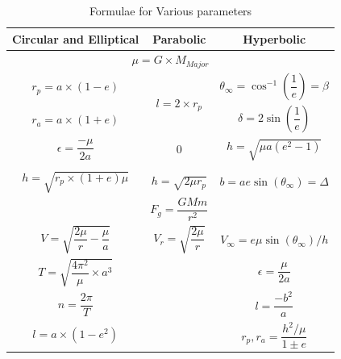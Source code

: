 \begin{table}[H]
\centering
\begin{tabular}{ccc}
\multicolumn{1}{c|}{\textbf{Circular and Elliptical}}           & \multicolumn{1}{c|}{\textbf{Parabolic}}               & \textbf{Hyperbolic}                             \\ \hline
\multicolumn{3}{c}{$\mu=G\times M_{Major}$}                                                                                                                               \\ 
\multicolumn{1}{c|}{$r_p=a\times (1-e)$}                        & \multicolumn{1}{c|}{\multirow{2}{*}{$l=2\times r_p$}} & $\theta_\infty = \cos^{-1}(\dfrac{1}{e})=\beta$ \\
\multicolumn{1}{c|}{$r_a=a\times (1+e)$}                        & \multicolumn{1}{c|}{}                                 & $\delta = 2\sin(\dfrac{1}{e})$                  \\
\multicolumn{1}{c|}{$\epsilon = \dfrac{-\mu}{2a}$}              & \multicolumn{1}{c|}{$0$}                              & $h=\sqrt{\mu a(e^2-1)}$                         \\
\multicolumn{1}{l|}{}                                           & \multicolumn{1}{l|}{}                                 & \multicolumn{1}{l}{}                            \\
\multicolumn{1}{c|}{$h=\sqrt{r_p\times(1+e)\mu}$}               & \multicolumn{1}{c|}{$h=\sqrt{2\mu r_p}$}              & $b=ae\sin(\theta_\infty)=\Delta$                \\
\multicolumn{1}{l}{}                                            & \multirow{2}{*}{$F_g=\dfrac{GMm}{r^2}$}               & \multicolumn{1}{l}{}                            \\
                                                                &                                                       &                                                 \\
\multicolumn{1}{c|}{$V= \sqrt{\dfrac{2\mu}{r}-\dfrac{\mu}{a}}$} & \multicolumn{1}{c|}{$V_r=\sqrt{\dfrac{2\mu}{r}}$}     & $V_\infty=e\mu\sin(\theta_\infty)/h$            \\
\multicolumn{1}{c|}{$T = \sqrt{\dfrac{4\pi^2}{\mu}\times a^3}$} & \multicolumn{1}{c|}{}                                 & $\epsilon=\dfrac{\mu}{2a}$                      \\
\multicolumn{1}{c|}{$n = \dfrac{2 \pi}{T}$}                     & \multicolumn{1}{c|}{}                                 & $l=\dfrac{-b^2}{a}$                             \\
\multicolumn{1}{c|}{$l=a\times(1-e^2)$}                         & \multicolumn{1}{c|}{}                                 & $r_p,r_a = \dfrac{h^2/\mu}{1 \pm e}$           
\end{tabular}
\caption{Formulae for Various parameters}
\label{tab:vpco}
\end{table}
